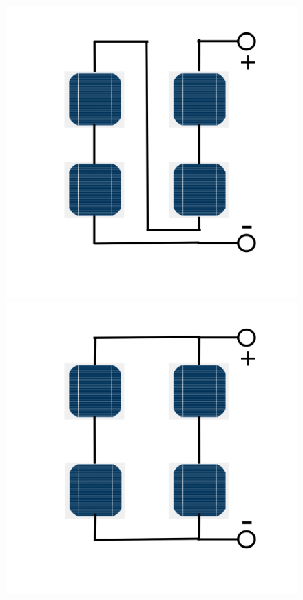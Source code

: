 \documentclass[a4paper]{article}
\begin{document}
 \begin{figure}[H]
    \centering
    \includegraphics[scale=0.10]{Series(S)}
    \includegraphics[scale=0.10]{Series-parallel(SP)}

\end{figure}
\end{document}

